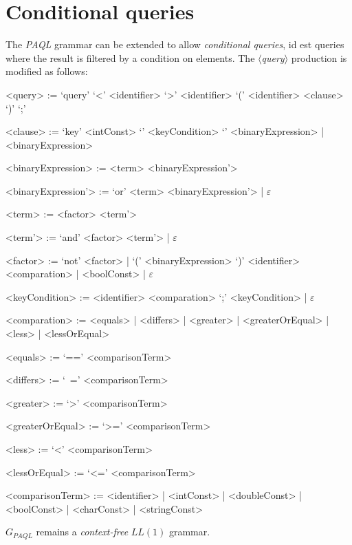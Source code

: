 \documentclass[10pt]{article}  %
\begin{document}
\section{Conditional queries}
    The \emph{PAQL} grammar can be extended to allow \emph{conditional queries}, id est queries where the result is filtered by a condition
    on elements. The $\langle$\emph{query}$\rangle$ production is modified as follows:
    \vspace{1em}
    \begin{mdframed}
        \begin{grammar}
            <query> := `query' `<' <identifier> `>' <identifier> `(' <identifier> <clause> `)' `;'

            <clause> := `key' <intConst> `{' <keyCondition> `}' <binaryExpression> | <binaryExpression>

            <binaryExpression> := <term> <binaryExpression'>

            <binaryExpression'> := `or' <term> <binaryExpression'> | $\varepsilon$

            <term> := <factor> <term'>

            <term'> := `and' <factor> <term'> | $\varepsilon$

            <factor> := `not' <factor> | `(' <binaryExpression> `)' \alt <identifier> <comparation> | <boolConst> | $\varepsilon$

            <keyCondition> := <identifier> <comparation> `;' <keyCondition> | $\varepsilon$

            <comparation> := <equals> | <differs> | <greater> | <greaterOrEqual> | <less> | <lessOrEqual>

            <equals> := `==' <comparisonTerm>

            <differs> := `~=' <comparisonTerm>

            <greater> := `>' <comparisonTerm>

            <greaterOrEqual> := `>=' <comparisonTerm>

            <less> := `<' <comparisonTerm>

            <lessOrEqual> := `<=' <comparisonTerm>

            <comparisonTerm> := <identifier> | <intConst> | <doubleConst> | <boolConst> | <charConst> | <stringConst>
        \end{grammar}
    \end{mdframed}
    \vspace{1em}
    $G_{PAQL}$ remains a \emph{context-free} $LL(1)$ grammar.
\end{document}
